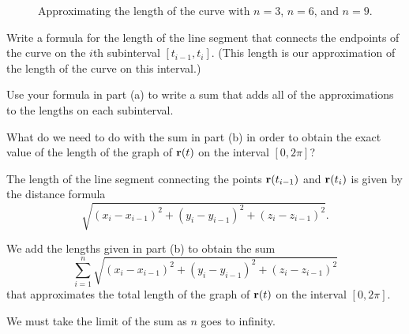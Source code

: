 \begin{pa}
\begin{figure}[ht]
\begin{center}
\end{center}
\caption{Approximating the length of the curve with $n=3$, $n=6$, and $n=9$.}
\label{F:9.8.Arc_length}
\end{figure}
    \ba
	\item Write a formula for the length of the line segment that connects the endpoints of the curve on the $i$th subinterval $[t_{i-1},t_i]$. (This length is our approximation of the length of the curve on this interval.) 
	
    \item Use your formula in part (a) to write a sum that adds all of the approximations to the lengths on each subinterval.

    \item What do we need to do with the sum in part (b) in order to obtain the exact value of the length of the graph of $\mathbf{r}(t)$ on the interval $[0,2\pi]$?

    \ea


\end{pa} 


\begin{activitySolution}
   \ba
	\item The length of the line segment connecting the points $\mathbf{r}(t_{i-1})$ and $\mathbf{r}(t_i)$ is given by the distance formula
\[\sqrt{(x_i-x_{i-1})^2+(y_{i}-y_{i-1})^2 + (z_{i}-z_{i-1})^2}.\]

    \item We add the lengths given in part (b) to obtain the sum
\[\sum_{i=1}^n \sqrt{(x_i-x_{i-1})^2+(y_{i}-y_{i-1})^2 + (z_{i}-z_{i-1})^2}\]
that approximates the total length of the graph of $\mathbf{r}(t)$ on the interval $[0,2 \pi]$.

    \item We must take the limit of the sum as $n$ goes to infinity.


    \ea
\end{activitySolution}


\afterpa 